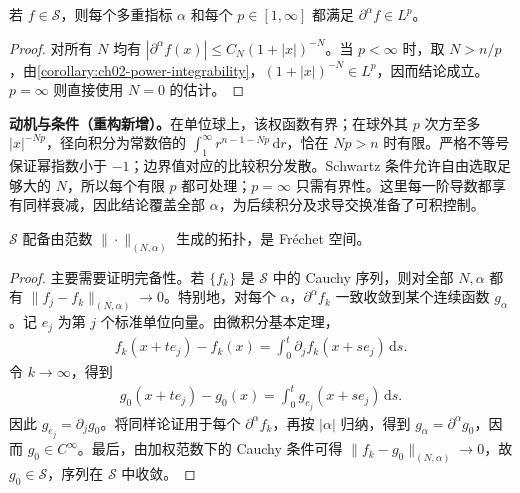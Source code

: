 \documentclass[../../main.tex]{subfiles}
\begin{document}
\begin{proposition}\label{proposition:ch08-schwartz-lp}
若 $f\in\mathcal S$，则每个多重指标 $\alpha$ 和每个 $p\in[1,\infty]$ 都满足 $\partial^\alpha f\in L^p$。
\end{proposition}
\begin{proof}
对所有 $N$ 均有 $|\partial^\alpha f(x)|\leqslant C_N(1+|x|)^{-N}$。当 $p<\infty$ 时，取 $N>n/p$，由\cref{corollary:ch02-power-integrability}，$(1+|x|)^{-N}\in L^p$，因而结论成立。$p=\infty$ 则直接使用 $N=0$ 的估计。
\end{proof}
\begin{remark}
\textbf{动机与条件（重构新增）。}在单位球上，该权函数有界；在球外其 $p$ 次方至多 $|x|^{-Np}$，径向积分为常数倍的 $\int_1^\infty r^{n-1-Np}\,\mathrm dr$，恰在 $Np>n$ 时有限。严格不等号保证幂指数小于 $-1$；边界值对应的比较积分发散。Schwartz 条件允许自由选取足够大的 $N$，所以每个有限 $p$ 都可处理；$p=\infty$ 只需有界性。这里每一阶导数都享有同样衰减，因此结论覆盖全部 $\alpha$，为后续积分及求导交换准备了可积控制。
\end{remark}
\begin{proposition}\label{proposition:ch08-schwartz-frechet}
$\mathcal S$ 配备由范数 $\|\cdot\|_{(N,\alpha)}$ 生成的拓扑，是 Fréchet 空间。
\end{proposition}
\begin{proof}
主要需要证明完备性。若 $\{f_k\}$ 是 $\mathcal S$ 中的 Cauchy 序列，则对全部 $N,\alpha$ 都有 $\|f_j-f_k\|_{(N,\alpha)}\to0$。特别地，对每个 $\alpha$，$\partial^\alpha f_k$ 一致收敛到某个连续函数 $g_\alpha$。记 $e_j$ 为第 $j$ 个标准单位向量。由微积分基本定理，
\begin{align*}
f_k(x+te_j)-f_k(x)=\int_0^t\partial_jf_k(x+se_j)\,\mathrm ds.
\end{align*}
令 $k\to\infty$，得到
\begin{align*}
g_0(x+te_j)-g_0(x)=\int_0^t g_{e_j}(x+se_j)\,\mathrm ds.
\end{align*}
因此 $g_{e_j}=\partial_jg_0$。将同样论证用于每个 $\partial^\alpha f_k$，再按 $|\alpha|$ 归纳，得到 $g_\alpha=\partial^\alpha g_0$，因而 $g_0\in C^\infty$。最后，由加权范数下的 Cauchy 条件可得 $\|f_k-g_0\|_{(N,\alpha)}\to0$，故 $g_0\in\mathcal S$，序列在 $\mathcal S$ 中收敛。
\end{proof}
\end{document}
